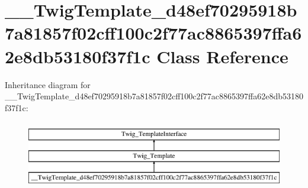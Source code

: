 \hypertarget{class_____twig_template__d48ef70295918b7a81857f02cff100c2f77ac8865397ffa62e8db53180f37f1c}{}\section{\+\_\+\+\_\+\+Twig\+Template\+\_\+d48ef70295918b7a81857f02cff100c2f77ac8865397ffa62e8db53180f37f1c Class Reference}
\label{class_____twig_template__d48ef70295918b7a81857f02cff100c2f77ac8865397ffa62e8db53180f37f1c}
Inheritance diagram for \+\_\+\+\_\+\+Twig\+Template\+\_\+d48ef70295918b7a81857f02cff100c2f77ac8865397ffa62e8db53180f37f1c\+:\begin{figure}[H]
\begin{center}
\leavevmode
\includegraphics[height=3.000000cm]{class_____twig_template__d48ef70295918b7a81857f02cff100c2f77ac8865397ffa62e8db53180f37f1c}
\end{center}
\end{figure}
